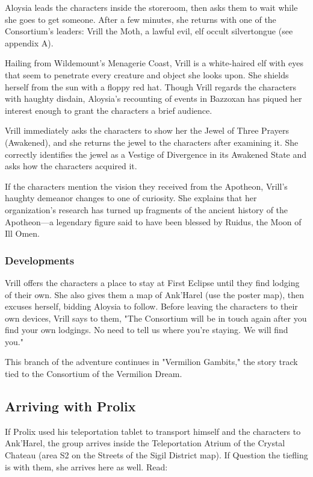 \documentclass[10pt,a4paper,twoside,twocolumn,openany,nodeprecatedcode]{dndbook}
\begin{document}
Aloysia leads the characters inside the storeroom, then asks them to wait while she goes to get someone. After a few minutes, she returns with one of the Consortium's leaders: Vrill the Moth, a lawful evil, elf occult silvertongue (see appendix A).

Hailing from Wildemount's Menagerie Coast, Vrill is a white-haired elf with eyes that seem to penetrate every creature and object she looks upon. She shields herself from the sun with a floppy red hat. Though Vrill regards the characters with haughty disdain, Aloysia's recounting of events in Bazzoxan has piqued her interest enough to grant the characters a brief audience.

Vrill immediately asks the characters to show her the Jewel of Three Prayers (Awakened), and she returns the jewel to the characters after examining it. She correctly identifies the jewel as a Vestige of Divergence in its Awakened State and asks how the characters acquired it.

If the characters mention the vision they received from the Apotheon, Vrill's haughty demeanor changes to one of curiosity. She explains that her organization's research has turned up fragments of the ancient history of the Apotheon—a legendary figure said to have been blessed by Ruidus, the Moon of Ill Omen.

\subsubsection{Developments}
Vrill offers the characters a place to stay at First Eclipse until they find lodging of their own. She also gives them a map of Ank'Harel (use the poster map), then excuses herself, bidding Aloysia to follow. Before leaving the characters to their own devices, Vrill says to them, "The Consortium will be in touch again after you find your own lodgings. No need to tell us where you're staying. We will find you."

This branch of the adventure continues in "Vermilion Gambits," the story track tied to the Consortium of the Vermilion Dream.

\subsection{Arriving with Prolix}
If Prolix used his teleportation tablet to transport himself and the characters to Ank'Harel, the group arrives inside the Teleportation Atrium of the Crystal Chateau (area S2 on the Streets of the Sigil District map). If Question the tiefling is with them, she arrives here as well. Read:
\end{document}
